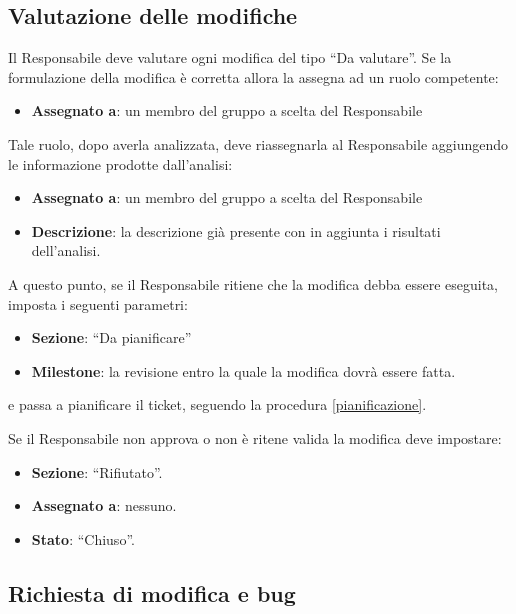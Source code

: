\subsection{Valutazione delle modifiche}

Il Responsabile deve valutare ogni modifica del tipo ``Da valutare''. Se la formulazione della modifica è corretta allora la assegna ad un ruolo competente:
\begin{itemize}
 \item \textbf{Assegnato a}: un membro del gruppo a scelta del Responsabile
\end{itemize}

Tale ruolo, dopo averla analizzata, deve riassegnarla al Responsabile aggiungendo le informazione prodotte dall'analisi:
\begin{itemize}
 \item \textbf{Assegnato a}: un membro del gruppo a scelta del Responsabile
 \item \textbf{Descrizione}: la descrizione già presente con in aggiunta i risultati dell'analisi.
\end{itemize}

A questo punto, se il Responsabile ritiene che la modifica debba essere eseguita, imposta i seguenti parametri:
\begin{itemize}
 \item \textbf{Sezione}: ``Da pianificare''
 \item \textbf{Milestone}: la revisione entro la quale la modifica dovrà essere fatta.
\end{itemize}
e passa a pianificare il ticket, seguendo la procedura \ref{pianificazione}.

Se il Responsabile non approva o non è ritene valida la modifica deve impostare:
\begin{itemize}
 \item \textbf{Sezione}: ``Rifiutato''.
 \item \textbf{Assegnato a}: nessuno.
 \item \textbf{Stato}: ``Chiuso''.
\end{itemize}

\subsection{Richiesta di modifica e bug}

